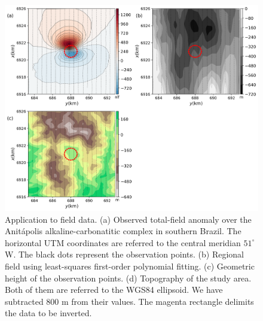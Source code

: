 \begin{figure}
    \centering
    \includegraphics[width=\linewidth]{figures/field_data_alt_topo.png}
    \caption{Application to field data.  (a) Observed total-field anomaly over the  
    Anit{\'a}polis alkaline-carbonatitic complex in southern Brazil. The horizontal UTM 
    coordinates are referred to the central meridian $ 51^\circ $ W. 
    The black dots represent the observation points.
    (b) Regional field using least-squares first-order polynomial fitting. 
    (c) Geometric height of the observation points. (d) Topography of the study area.
    Both of them are referred to the WGS84 ellipsoid. We have subtracted 
    $ 800 $ m from their values. 
    The magenta rectangle delimits the data to be inverted.
    }
    \label{fig:real_data}
\end{figure}

